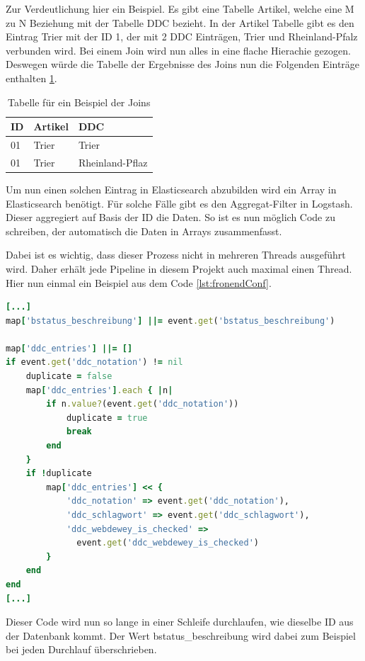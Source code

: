 Zur Verdeutlichung hier ein Beispiel.
Es gibt eine Tabelle Artikel, welche eine M zu N Beziehung mit der Tabelle DDC bezieht. In der Artikel Tabelle gibt es den Eintrag Trier mit der ID 1, der mit 2 DDC Einträgen, Trier und Rheinland-Pfalz verbunden wird. Bei einem Join wird nun alles in eine flache Hierachie gezogen. Deswegen würde die Tabelle der Ergebnisse des Joins nun die Folgenden Einträge enthalten \ref{tbl:join}.

\begin{table} %
	\centering
		\begin{tabular}{l | l | l}
		    \textbf{ID} & \textbf{Artikel} & \textbf{DDC} \\
        \hline
        01 & Trier & Trier \\
        01 & Trier & Rheinland-Pflaz  \\
		\end{tabular}
    \caption{Tabelle für ein Beispiel der Joins}
    \label{tbl:join}
\end{table}

Um nun einen solchen Eintrag in Elasticsearch abzubilden wird ein Array in Elasticsearch benötigt. Für solche Fälle gibt es den Aggregat-Filter in Logstash. Dieser aggregiert auf Basis der ID die Daten. So ist es nun möglich Code zu schreiben, der automatisch die Daten in Arrays zusammenfasst.

Dabei ist es wichtig, dass dieser Prozess nicht in mehreren Threads ausgeführt wird. Daher erhält jede Pipeline in diesem Projekt auch maximal einen Thread.
Hier nun einmal ein Beispiel aus dem Code \ref{lst:fronendConf}.


\begin{lstlisting}[language=Ruby, frame=single, label={lst:fronendConf}] 
[...]
map['bstatus_beschreibung'] ||= event.get('bstatus_beschreibung')

map['ddc_entries'] ||= []
if event.get('ddc_notation') != nil
    duplicate = false
    map['ddc_entries'].each { |n|
        if n.value?(event.get('ddc_notation'))
            duplicate = true
            break
        end
    }
    if !duplicate
        map['ddc_entries'] << {
            'ddc_notation' => event.get('ddc_notation'),
            'ddc_schlagwort' => event.get('ddc_schlagwort'),
            'ddc_webdewey_is_checked' => 
              event.get('ddc_webdewey_is_checked')
        }
    end
end
[...]
\end{lstlisting}

Dieser Code wird nun so lange in einer Schleife durchlaufen, wie dieselbe ID aus der Datenbank kommt. Der Wert bstatus\_beschreibung wird dabei zum Beispiel bei jeden Durchlauf überschrieben. 

